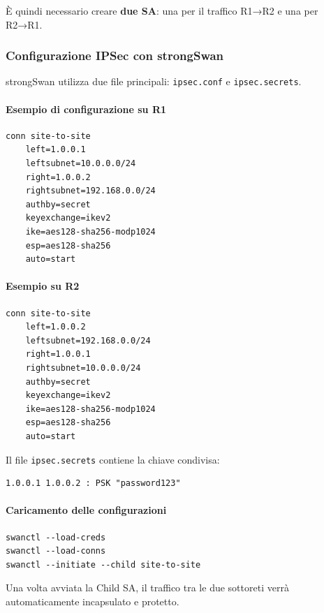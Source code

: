 È quindi necessario creare \textbf{due SA}: una per il traffico R1→R2 e una per R2→R1.

\subsubsection{Configurazione IPSec con strongSwan}

strongSwan utilizza due file principali: \texttt{ipsec.conf} e \texttt{ipsec.secrets}.

\paragraph{Esempio di configurazione su R1}

\begin{verbatim}
conn site-to-site
    left=1.0.0.1
    leftsubnet=10.0.0.0/24
    right=1.0.0.2
    rightsubnet=192.168.0.0/24
    authby=secret
    keyexchange=ikev2
    ike=aes128-sha256-modp1024
    esp=aes128-sha256
    auto=start
\end{verbatim}

\paragraph{Esempio su R2}

\begin{verbatim}
conn site-to-site
    left=1.0.0.2
    leftsubnet=192.168.0.0/24
    right=1.0.0.1
    rightsubnet=10.0.0.0/24
    authby=secret
    keyexchange=ikev2
    ike=aes128-sha256-modp1024
    esp=aes128-sha256
    auto=start
\end{verbatim}

Il file \texttt{ipsec.secrets} contiene la chiave condivisa:

\begin{verbatim}
1.0.0.1 1.0.0.2 : PSK "password123"
\end{verbatim}

\paragraph{Caricamento delle configurazioni}

\begin{verbatim}
swanctl --load-creds
swanctl --load-conns
swanctl --initiate --child site-to-site
\end{verbatim}

Una volta avviata la Child SA, il traffico tra le due sottoreti verrà automaticamente
incapsulato e protetto.

